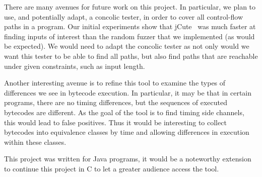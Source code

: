 
There are many avenues for future work on this project. In particular, 
we plan to use, and potentially adapt, a concolic tester, in order to
cover all control-flow paths in a program. Our initial experiments
show that jCute~\cite{conf/cav/SenA06} was much faster
at finding inputs of interest than the random fuzzer that we
implemented (as would be expected). We would need to adapt the
concolic tester as not only would we want this tester to
be able to find all paths, but also find paths that are reachable under
given constraints, such as input length. 

Another interesting avenue is to refine this tool to examine the types
of differences we see in bytecode execution. In particular, it may be
that in certain programs, there are no timing
differences, but the sequences of executed bytecodes are different. As
the goal of the tool is to find timing side channels, this would lead to
false positives. Thus it would be interesting to 
collect bytecodes into equivalence classes by time and allowing
differences in execution within these classes. 

This project was written for Java programs, it would be a noteworthy
extension to continue this project in C to let a greater audience
access the tool. 
